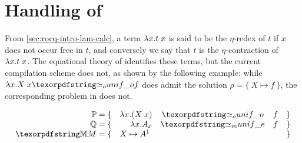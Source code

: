 






\section{Handling of \maybeeta}\label{sec:eta}

From \cref{sec:rocq-intro-lam-calc}, a term 
$\lambda x. t \appsep x$ is said to be the $\eta$-redex of $t$ if
$x$ does not occur free in $t$, and conversely we say that $t$ is the $\eta$-contraction of
$\lambda x. t \appsep x$. The equational theory of \Fo{} identifies these terms,
but the current compilation scheme does not,
as shown by the following example:
while $\lambda x.X \appsep x \Uo{} f$ does admit the solution
$\rho = \{~ X \mapsto f ~\}$, the corresponding problem in
\hoUnifPb does not.

$$
\begin{array}{rrcll}
\foUnifPb = \{ & \lambda x.(X\appsep x) & \Uo & f & \}\\
\hoUnifPb = \{ & \lambda x.A_x & \Ue & f & \}\\
\mapStore = \{ & \multicolumn{3}{l}{X \mapsto A^{1}} & \}\\
\end{array}
$$

